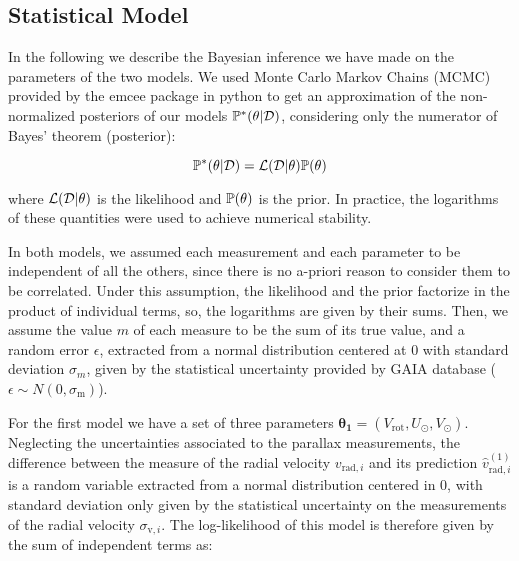 \subsection{Statistical Model}\label{subsec:StatisticalModel}
In the following we describe the Bayesian inference we have made on the parameters of the two models. 
We used Monte Carlo Markov Chains (MCMC) provided by the emcee package in python 
to get an approximation of the non-normalized posteriors of our models 
$\mathbb{P}^{*}(\theta \vert \mathcal{D})$, considering only the numerator of Bayes' theorem (posterior):

\begin{equation}\label{Eq:NonNormPosterior}
    \mathbb{P}^{*}(\theta \vert \mathcal{D}) = \mathcal{L}(\mathcal{D} \vert \theta) \mathbb{P}(\theta)
\end{equation}

\noindent where $\mathcal{L}(\mathcal{D} \vert \theta)$ is the likelihood and $\mathbb{P}(\theta)$ is the prior. In practice, the logarithms of these quantities were used to achieve numerical stability.

In both models, we assumed each measurement and each parameter to be independent of all the others, since there is no a-priori reason to consider them to be correlated. Under this assumption, the likelihood and the prior factorize in the product of individual terms, so, the logarithms are given by their sums. Then, we assume the value $m$ of each measure to be  the sum of its true value, and a random error $\epsilon$, extracted from a normal distribution centered at 0 with standard deviation $\sigma_m$, given by the statistical uncertainty provided by GAIA database ($\epsilon \sim N(0, \sigma_\text{m})$).

For the first model we have a set of three parameters $\mathbf{\theta_1} = (V_{\text{rot}}, U_{\odot}, V_{\odot})$. 
Neglecting the uncertainties associated to the parallax measurements, the difference between the measure of the radial velocity $v_{\text{rad}, i}$ and its prediction $\hat{v}^{(1)}_{\text{rad}, i}$ is a random variable extracted from a normal distribution centered in 0, with standard deviation only given by the statistical uncertainty on the measurements of the radial velocity $\sigma_{\text{v},i}$. 
The log-likelihood of this model is therefore given by the sum of independent terms as:

